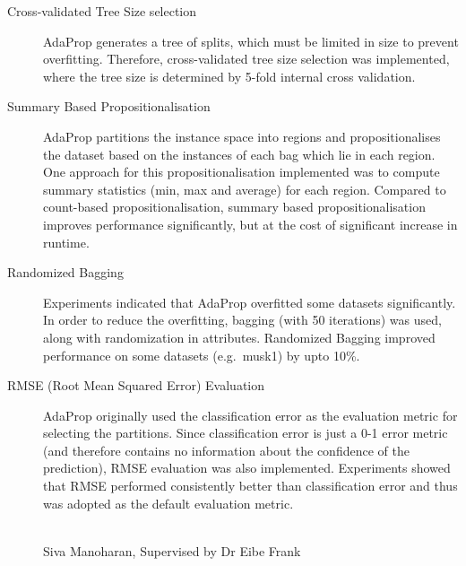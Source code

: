 \documentclass[a4paper,12pt]{article} %
\begin{document}
\begin{description}
    \item[Cross-validated Tree Size selection]
        AdaProp generates a tree of splits, 
            which must be limited in size to prevent
            overfitting.
        Therefore, 
            cross-validated tree size selection was implemented, 
            where the tree size is determined by 
            5-fold internal cross validation.
            
    \item[Summary Based Propositionalisation]
        AdaProp partitions the instance space into 
            regions and propositionalises the dataset
            based on the instances of each bag which lie in
            each region.
        One approach for this propositionalisation implemented
            was to compute summary statistics (min, max and average) 
            for each region.
        Compared to count-based propositionalisation, 
            summary based propositionalisation 
            improves performance significantly, 
            but at the cost of significant increase in runtime.
            
    \item[Randomized Bagging]
        Experiments indicated that 
            AdaProp overfitted some datasets significantly.
        In order to reduce the overfitting, 
            bagging (with 50 iterations) was used, 
            along with randomization in attributes.
        Randomized Bagging improved performance on 
            some datasets (e.g.\ musk1) by upto 10\%.
    
    \item[RMSE (Root Mean Squared Error) Evaluation]
        AdaProp originally used the classification 
            error as the evaluation metric for selecting
            the partitions.
        Since classification error is just a 0-1 error 
            metric (and therefore contains no information
            about the confidence of the prediction),
        RMSE evaluation was also implemented.
        Experiments showed that RMSE performed 
            consistently better than classification error and 
            thus was adopted as the default evaluation metric.

\begin{flushright}
~ \\ Siva Manoharan, Supervised by Dr Eibe Frank
\end{flushright}

\end{description}


\end{document}

